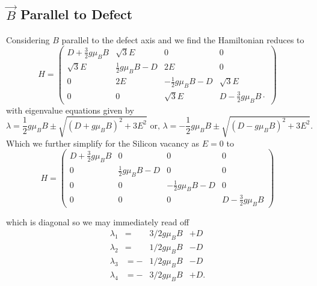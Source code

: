 \subsection{$\vec{B}$ Parallel to Defect}
Considering $B$ parallel to the defect axis and  we find \cite{Kirmse1995} the Hamiltonian reduces to
\begin{equation}
	H = \begin{pmatrix}
		D + \frac{3}{2} g \mu_B B & \sqrt{3}E               & 0                        & 0                               \\
		\sqrt{3}E                 & \frac{1}{2}g \mu_B B -D & 2E                       & 0                               \\
		0                         & 2E                      & -\frac{1}{2}g\mu_B B - D & \sqrt{3}E                       \\
		0                         & 0                       & \sqrt{3}E                & D - \frac{3}{2} g \mu_B B \cdot
	\end{pmatrix}%
	\label{eq:}
\end{equation}
with eigenvalue equations given by
\begin{equation}
	\lambda = \frac{1}{2}g\mu_B B \pm \sqrt{(D + g\mu_B B)^2 + 3E^2}
	\text{ or, }
	\lambda = -\frac{1}{2} g\mu_B B \pm \sqrt{(D-g\mu_B B)^2 + 3E^2}.
\end{equation}
Which we further simplify for the Silicon vacancy as $E=0$ \cite{Nagy2019} to
\begin{equation}
	H = \begin{pmatrix}
		D + \frac{3}{2} g \mu_B B & 0                       & 0                        & 0                         \\
		0                         & \frac{1}{2}g \mu_B B -D & 0                        & 0                         \\
		0                         & 0                       & -\frac{1}{2}g\mu_B B - D & 0                         \\
		0                         & 0                       & 0                        & D - \frac{3}{2} g \mu_B B
	\end{pmatrix}%
	\label{eq:}
\end{equation}

which is diagonal so we may immediately read off
\begin{equation}
	\begin{align}
		\lambda_1 & =   & 3/2   g \mu_B B & +  D  \\
		\lambda_2 & =   & 1/2   g \mu_B B & -D    \\
		\lambda_3 & = - & 1/2  g \mu_B B  & -D    \\
		\lambda_4 & = - & 3/2  g \mu_B B  & +  D.
	\end{align}
	\label{eq:}
\end{equation}

